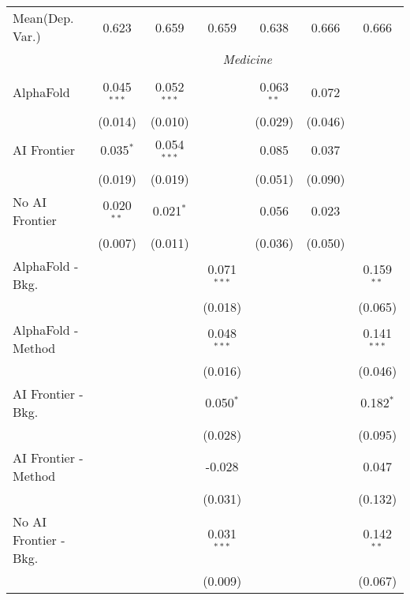 \begin{tabular}{lcccccc}
Mean(Dep. Var.) & 0.623 & 0.659 & 0.659 & 0.638 & 0.666 & 0.666 \\
 & \multicolumn{6}{c}{\textit{Medicine}} \\ \\
   AlphaFold               & 0.045$^{***}$ & 0.052$^{***}$ &               & 0.063$^{**}$ & 0.072   &   \\   
                           & (0.014)       & (0.010)       &               & (0.029)      & (0.046) &   \\   
   AI Frontier             & 0.035$^{*}$   & 0.054$^{***}$ &               & 0.085        & 0.037   &   \\   
                           & (0.019)       & (0.019)       &               & (0.051)      & (0.090) &   \\   
   No AI Frontier          & 0.020$^{**}$  & 0.021$^{*}$   &               & 0.056        & 0.023   &   \\   
                           & (0.007)       & (0.011)       &               & (0.036)      & (0.050) &   \\   
   AlphaFold - Bkg.        &               &               & 0.071$^{***}$ &              &         & 0.159$^{**}$\\   
                           &               &               & (0.018)       &              &         & (0.065)\\   
   AlphaFold - Method      &               &               & 0.048$^{***}$ &              &         & 0.141$^{***}$\\   
                           &               &               & (0.016)       &              &         & (0.046)\\   
   AI Frontier - Bkg.      &               &               & 0.050$^{*}$   &              &         & 0.182$^{*}$\\   
                           &               &               & (0.028)       &              &         & (0.095)\\   
   AI Frontier - Method    &               &               & -0.028        &              &         & 0.047\\   
                           &               &               & (0.031)       &              &         & (0.132)\\   
   No AI Frontier - Bkg.   &               &               & 0.031$^{***}$ &              &         & 0.142$^{**}$\\   
                           &               &               & (0.009)       &              &         & (0.067)\\   

\end{tabular}
